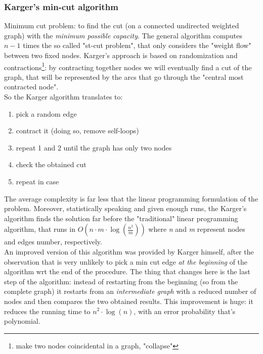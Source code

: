 \documentclass{article}
\begin{document}
			\subsubsection{Karger's min-cut algorithm}
				Minimum cut problem: to find the cut (on a connected undirected weighted graph) with the \textit{minimum possible capacity}. The general algorithm computes $n - 1$ times the so called "st-cut problem", that only considers the "weight flow" between two fixed nodes. Karger's approach is based on randomization and contractions\footnote{make two nodes coincidental in a graph, "collapse"}: by contracting together nodes we will eventually find a cut of the graph, that will be represented by the arcs that go through the "central most contracted node".\\
				So the Karger algorithm translates to:
				\begin{enumerate}
					\item pick a random edge
					\item contract it (doing so, remove self-loops)
					\item repeat 1 and 2 until the graph has only two nodes
					\item check the obtained cut
					\item repeat in case
				\end{enumerate}
				The average complexity is far less that the linear programming formulation of the problem. Moreover, statistically speaking and given enough runs, the Karger's algorithm finds the solution far before the "traditional" linear programming algorithm, that runs in $O(n \cdot m \cdot \log (\frac{n^2}{m}))$ where \emph{n} and \emph{m} represent nodes and edges number, respectively.\\
				An improved version of this algorithm was provided by Karger himself, after the observation that is very unlikely to pick a min cut edge \textit{at the beginning} of the algorithm wrt the end of the procedure. The thing that changes here is the last step of the algorithm: instead of restarting from the beginning (so from the complete graph) it restarts from an \textit{intermediate graph} with a reduced number of nodes and then compares the two obtained results. This improvement is huge: it reduces the running time to $n^2 \cdot \log(n)$, with an error probability that's polynomial.
\end{document}
